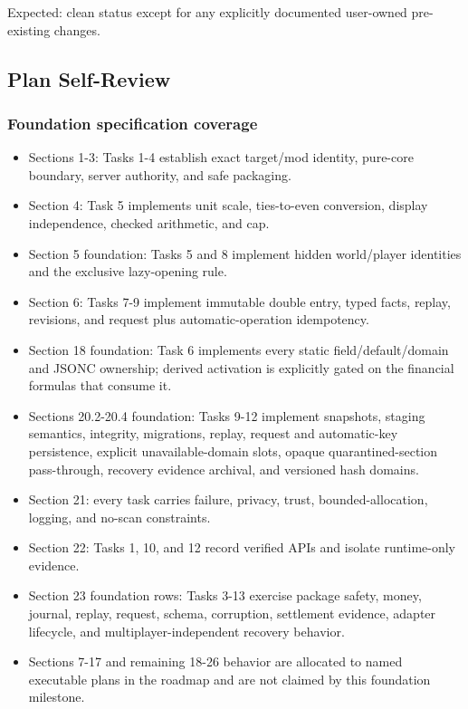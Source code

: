 \documentclass[
  10pt,
  letterpaper,
]{article}
\providecommand{\tightlist}{%
  \setlength{\itemsep}{0pt}\setlength{\parskip}{0pt}}
\begin{document}
Expected: clean status except for any explicitly documented user-owned
pre-existing changes.

\subsection{Plan Self-Review}\label{plan-self-review}

\subsubsection{Foundation specification
coverage}\label{foundation-specification-coverage}

\begin{itemize}
\tightlist
\item
  Sections 1-3: Tasks 1-4 establish exact target/mod identity, pure-core
  boundary, server authority, and safe packaging.
\item
  Section 4: Task 5 implements unit scale, ties-to-even conversion,
  display independence, checked arithmetic, and cap.
\item
  Section 5 foundation: Tasks 5 and 8 implement hidden world/player
  identities and the exclusive lazy-opening rule.
\item
  Section 6: Tasks 7-9 implement immutable double entry, typed facts,
  replay, revisions, and request plus automatic-operation idempotency.
\item
  Section 18 foundation: Task 6 implements every static
  field/\allowbreak{}default/\allowbreak{}domain and JSONC ownership;
  derived activation is explicitly gated on the financial formulas that
  consume it.
\item
  Sections 20.2-20.4 foundation: Tasks 9-12 implement snapshots, staging
  semantics, integrity, migrations, replay, request and automatic-key
  persistence, explicit unavailable-domain slots, opaque
  quarantined-section pass-through, recovery evidence archival, and
  versioned hash domains.
\item
  Section 21: every task carries failure, privacy, trust,
  bounded-allocation, logging, and no-scan constraints.
\item
  Section 22: Tasks 1, 10, and 12 record verified APIs and isolate
  runtime-only evidence.
\item
  Section 23 foundation rows: Tasks 3-13 exercise package safety, money,
  journal, replay, request, schema, corruption, settlement evidence,
  adapter lifecycle, and multiplayer-independent recovery behavior.
\item
  Sections 7-17 and remaining 18-26 behavior are allocated to named
  executable plans in the roadmap and are not claimed by this foundation
  milestone.
\end{itemize}
\end{document}
